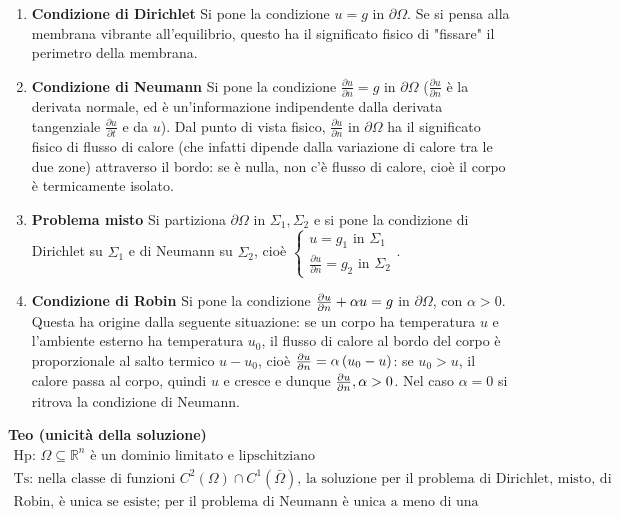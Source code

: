 \documentclass{article}
\begin{document}
\begin{enumerate}
\item \textbf{Condizione di Dirichlet} Si pone la condizione $u=g$ in $%
\partial \Omega $. Se si pensa alla membrana vibrante all'equilibrio, questo
ha il significato fisico di "fissare" il perimetro della membrana.

\item \textbf{Condizione di Neumann} Si pone la condizione $\frac{\partial u%
}{\partial n}=g$ in $\partial \Omega $ ($\frac{\partial u}{\partial n}$ \`{e}
la derivata normale, ed \`{e} un'informazione indipendente dalla derivata
tangenziale $\frac{\partial u}{\partial t}$ e da $u$). Dal punto di vista
fisico, $\frac{\partial u}{\partial n}$ in $\partial \Omega $ ha il
significato fisico di flusso di calore (che infatti dipende dalla variazione
di calore tra le due zone) attraverso il bordo: se \`{e} nulla, non c'\`{e}
flusso di calore, cio\`{e} il corpo \`{e} termicamente isolato.

\item \textbf{Problema misto} Si partiziona $\partial \Omega $ in $\Sigma
_{1},\Sigma _{2}$ e si pone la condizione di Dirichlet su $\Sigma _{1}$ e di
Neumann su $\Sigma _{2}$, cio\`{e} $\left\{ 
\begin{array}{c}
u=g_{1}\text{ in }\Sigma _{1} \\ 
\frac{\partial u}{\partial n}=g_{2}\text{ in }\Sigma _{2}%
\end{array}%
\right. $.

\item \textbf{Condizione di Robin} Si pone la condizione $\frac{\partial u}{%
\partial n}+\alpha u=g$ in $\partial \Omega $, con $\alpha >0$. Questa ha
origine dalla seguente situazione: se un corpo ha temperatura $u$ e
l'ambiente esterno ha temperatura $u_{0}$, il flusso di calore al bordo del
corpo \`{e} proporzionale al salto termico $u-u_{0}$, cio\`{e} $\frac{%
\partial u}{\partial n}=\alpha \left( u_{0}-u\right) $: se $u_{0}>u$, il
calore passa al corpo, quindi $u$ e cresce e dunque $\frac{\partial u}{%
\partial n},\alpha >0$. Nel caso $\alpha =0$ si ritrova la condizione di
Neumann.
\end{enumerate}

\textbf{Teo (unicit\`{a} della soluzione)}%
\begin{gather*}
\text{Hp: }\Omega \subseteq 
\mathbb{R}
^{n}\text{ \`{e} un dominio limitato e lipschitziano} \\
\text{Ts: nella classe di funzioni }C^{2}\left( \Omega \right) \cap
C^{1}\left( \bar{\Omega}\right) \text{, la soluzione per il problema di
Dirichlet, misto, di } \\
\text{Robin, \`{e} unica se esiste; per il problema di Neumann \`{e} unica a
meno di una costante additiva}
\end{gather*}
\end{document}
